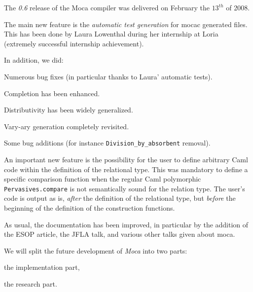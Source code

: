 

The {\em 0.6} release of the Moca compiler was delivered on February the
$13^{th}$ of 2008.

The main new feature is the {\em automatic test generation} for mocac
generated files. This has been done by Laura Lowenthal during her internship
at Loria (extremely successful internship achievement).



In addition, we did:

\begin{citemize}
  \item Numerous bug fixes (in particular thanks to Laura' automatic tests).
  \item Completion has been enhanced.
  \item Distributivity has been widely generalized.
  \item Vary-ary generation completely revisited.
  \item Some bug additions (for instance {\tt Division\_by\_absorbent} removal).
\end{citemize}



An important new feature is the possibility for the user to define
arbitrary Caml code within the definition of the relational type. This was
mandatory to define a specific comparison function when the regular Caml
polymorphic {\tt Pervasives.compare} is not semantically sound for the
relation type. The user's code is output as is, {\em after} the definition of the
relational type, but {\em before} the beginning of the definition of the
construction functions.

As usual, the documentation has been improved, in particular by the addition
of the ESOP article, the JFLA talk, and various other talks given about moca.



We will split the future development of {\em Moca} into two parts:

\begin{citemize}
  \item the implementation part,
  \item the research part.
\end{citemize}


